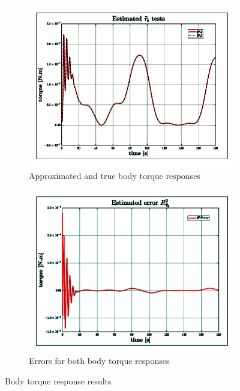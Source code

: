 \begin{figure}[hbtp]
\centering
\begin{subfigure}{0.49\textwidth}
\includegraphics[width=\textwidth]{graphs/tau-body}
\caption{Approximated and true body torque responses}
\label{fig:tau-body}
\end{subfigure}
\begin{subfigure}{0.49\textwidth}
\centering
\includegraphics[width=\textwidth]{graphs/tau-body-r}
\caption{Errors for both body torque responses}
\label{fig:tau-body-r}
\end{subfigure}
\caption{Body torque response results}
\label{fig:body-torque-tau-b}
\vspace{-4pt}
\end{figure}
